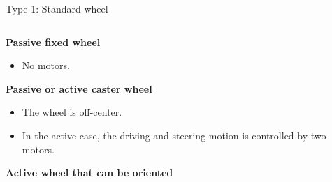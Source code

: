 \documentclass[compress]{beamer}
\begin{document}
\begin{frame}{Type 1: Standard wheel}
{\begin{columns}
\begin{column}{0.5\linewidth}
                \textbf{Passive fixed wheel}

                \begin{itemize}
                    \item No motors.
                \end{itemize}

                \textbf{Passive or active caster wheel}

                \begin{itemize}
                    \item The wheel is off-center.
                    \item In the active case, the driving and steering motion is controlled by
                        two motors.
                \end{itemize}

                \textbf{Active wheel that can be oriented}


\end{column}
\end{columns}}
\end{frame}
\end{document}
